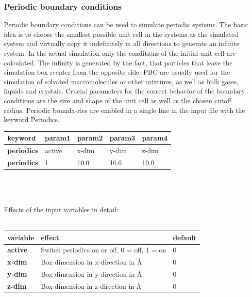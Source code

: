 \documentclass[10pt,a4paper]{article} %
\newif\ifdevelopment %
\begin{document}
{	\subsubsection{Periodic boundary conditions}
	Periodic boundary conditions can be used to simulate periodic systems. The basic idea is to choose the smallest possible unit cell in the systems as the simulated system and virtually copy it indefinitely in all directions to generate an infinite system. In the actual simulation only the conditions of the initial unit cell are calculated. The infinity is generated by the fact, that particles that leave the simulation box reenter from the opposite side. PBC are usually used for the simulation of solvated macromolecules or other mixtures, as well as bulk gases, liquids and crystals. Crucial parameters for the correct behavior of the boundary conditions are the size and shape of the unit cell as well as the chosen cutoff radius. Periodic bounda-ries are enabled in a single line in the input file with the keyword Periodics.\\
	\begin{tabularx}{\textwidth}{l|X|X|X|X}
		\textbf{keyword} & param1 & param2 & param3 & param4 \\
		\hline
		\textbf{periodics} & active & x-dim & y-dim & z-dim \\
		\textbf{periodics} & 1 & 10.0 & 10.0 & 10.0 \\
	\end{tabularx}\\~\\~\\
	Effects of the input variables in detail:\\~\\
	\begin{tabularx}{\textwidth}{l|X|X}
		\textbf{variable} & effect & default \\
		\hline
		\textbf{active} & Switch periodics on or off, 0 = off, 1 = on & 0 \\
		\textbf{x-dim} & Box-dimension in x-direction in Å & 0 \\
		\textbf{y-dim} & Box-dimension in y-direction in Å & 0 \\
		\textbf{z-dim} & Box-dimension in z-direction in Å & 0 \\
	\end{tabularx}~\\


	\ifdevelopment
	\newpage
}
\end{document}
